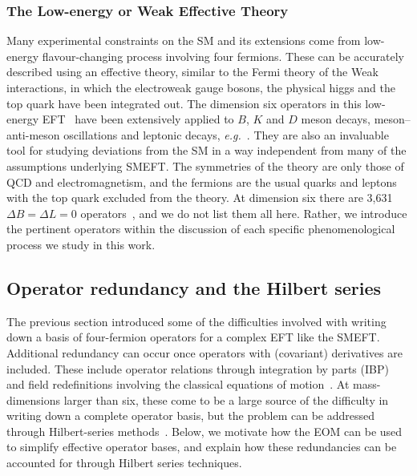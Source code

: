 \subsubsection{The Low-energy or Weak Effective Theory}

Many experimental constraints on the SM and its extensions come from low-energy
flavour-changing process involving four fermions. These can be accurately
described using an effective theory, similar to the Fermi theory of the Weak
interactions, in which the electroweak gauge bosons, the physical higgs and the
top quark have been integrated out. The dimension six operators in this
low-energy EFT~\cite{Jenkins:2017jig, Aebischer:2017gaw, Jenkins:2017dyc,
  Aebischer:2015fzz} have been extensively applied to $B$, $K$ and $D$ meson
decays, meson--anti-meson oscillations and leptonic decays,
\textit{e.g.}~\cite{Buchalla:1995vs}. They are also an invaluable tool for
studying deviations from the SM in a way independent from many of the
assumptions underlying SMEFT. The symmetries of the theory are only those of QCD
and electromagnetism, and the fermions are the usual quarks and leptons with the
top quark excluded from the theory. At dimension six there are 3,631
$\Delta B = \Delta L = 0$ operators~\cite{Jenkins:2017jig}, and we do not list
them all here. Rather, we introduce the pertinent operators within the
discussion of each specific phenomenological process we study in this work.

\subsection{Operator redundancy and the Hilbert series}

The previous section introduced some of the difficulties involved with writing
down a basis of four-fermion operators for a complex EFT like the SMEFT.
Additional redundancy can occur once operators with (covariant) derivatives are
included. These include operator relations through integration by parts (IBP)
and field redefinitions involving the classical equations of
motion~\cite{Buchmuller:1985jz, Arzt:1993gz, Georgi:1991ch}. At mass-dimensions
larger than six, these come to be a large source of the difficulty in writing
down a complete operator basis, but the problem can be addressed through
Hilbert-series methods~\cite{Lehman:2015via, Henning:2015daa, Lehman:2015coa,
  Henning:2015alf, Henning:2017fpj}. Below, we motivate how the EOM can be used
to simplify effective operator bases, and explain how these redundancies can be
accounted for through Hilbert series techniques.

